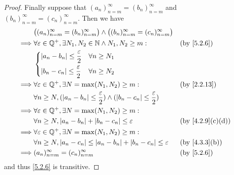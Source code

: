 \begin{proof}
  Finally suppose that \((a_n)_{n = m}^\infty = (b_n)_{n = m}^\infty\) and \((b_n)_{n = m}^\infty = (c_n)_{n = m}^\infty\).
  Then we have
  \begin{align*}
             & \big((a_n)_{n = m}^\infty = (b_n)_{n = m}^\infty\big) \land \big((b_n)_{n = m}^\infty = (c_n)_{n = m}^\infty\big)                                       \\
    \implies & \forall \varepsilon \in \Q^+, \exists N_1, N_2 \in \N \land N_1, N_2 \geq m:                                        &  & \by{5.2.6}                     \\
             & \begin{dcases}
                 \abs{a_n - b_n} \leq \dfrac{\varepsilon}{2} & \forall n \geq N_1 \\
                 \abs{b_n - c_n} \leq \dfrac{\varepsilon}{2} & \forall n \geq N_2 \\
               \end{dcases}                                                                                        \\
    \implies & \forall \varepsilon \in \Q^+, \exists N = \max(N_1, N_2) \geq m:                                                    &  & \by{2.2.13}                    \\
             & \forall n \geq N, (\abs{a_n - b_n} \leq \dfrac{\varepsilon}{2}) \land (\abs{b_n - c_n} \leq \dfrac{\varepsilon}{2})                                     \\
    \implies & \forall \varepsilon \in \Q^+, \exists N = \max(N_1, N_2) \geq m:                                                                                        \\
             & \forall n \geq N, \abs{a_n - b_n} + \abs{b_n - c_n} \leq \varepsilon                                                &  & \text{(by \cref{4.2.9}(c)(d))} \\
    \implies & \forall \varepsilon \in \Q^+, \exists N = \max(N_1, N_2) \geq m:                                                                                        \\
             & \forall n \geq N, \abs{a_n - c_n} \leq \abs{a_n - b_n} + \abs{b_n - c_n} \leq \varepsilon                           &  & \text{(by \cref{4.3.3}(b))}    \\
    \implies & (a_n)_{n = m}^\infty = (c_n)_{n = m}^\infty                                                                         &  & \by{5.2.6}
  \end{align*}
  and thus \cref{5.2.6} is transitive.
\end{proof}

